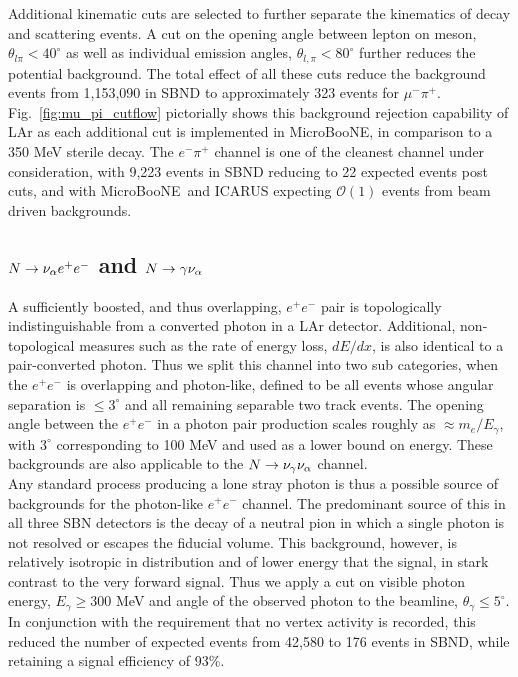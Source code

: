 \documentclass[11pt, a4paper]{article}
\newcommand{\reffig}[1]{Fig.~\ref{#1}}
\def\muboone{MicroBooNE}
\def\ster{\ensuremath N}
\begin{document}
Additional kinematic cuts are selected to further separate the kinematics of
decay and scattering events. A cut on the opening angle between lepton on
meson, $\theta_{l \pi} < 40^\circ$ as well as individual emission angles,
$\theta_{l,\pi} < 80^\circ$ further reduces the potential background. The total
effect of all these cuts reduce the background events from 1,153,090 in SBND to
approximately 323 events for $\mu^- \pi^+$.  \reffig{fig:mu_pi_cutflow}
pictorially shows this background rejection capability of LAr as each
additional cut is implemented in \muboone, in comparison to a 350 MeV sterile
decay. The $e^- \pi^+$ channel is one of the cleanest channel under
consideration, with 9,223 events in SBND reducing to 22 expected events post
cuts, and with \muboone\ and ICARUS expecting $\mathcal{O}(1)$ events from beam
driven backgrounds.


\subsection{$\ster \rightarrow \nu_\alpha e^+ e^-$ and $\ster \rightarrow \gamma \nu_\alpha$ }

A sufficiently boosted, and thus overlapping, $e^+e^-$ pair is topologically
indistinguishable from a converted photon in a LAr detector. Additional,
non-topological measures such as the rate of energy loss, $dE/dx$, is also
identical to a pair-converted photon. Thus we split this channel into two sub
categories, when the $e^+e^-$ is overlapping and photon-like, defined to be all
events whose angular separation is $\leq 3^\circ$\cite{Spitz:2011wba} and all
remaining separable two track events. The opening angle between the $e^+e^-$ in
a photon pair production scales roughly as $\approx m_e/E_\gamma$, with
$3^\circ$ corresponding to 100 MeV and used as a lower bound on energy. These
backgrounds are also applicable to the $\ster \rightarrow \nu_\gamma
\nu_\alpha$ channel.\\ 

Any standard process producing a lone stray photon is thus a possible source of
backgrounds for the photon-like $e^+e^-$ channel. The predominant source of
this in all three SBN detectors is the decay of a neutral pion in which a
single photon is not resolved or escapes the fiducial volume. This background,
however, is relatively isotropic in distribution and of lower energy that the
signal, in stark contrast to the very forward signal. Thus we apply a cut on
visible photon energy, $E_\gamma \geq 300 $ MeV and angle of the observed
photon to the beamline, $\theta_\gamma \leq 5^\circ$. In conjunction with the
requirement that no vertex activity is recorded, this reduced the number of
expected events from 42,580 to 176 events in SBND, while retaining a signal
efficiency of 93\%.
\end{document}
